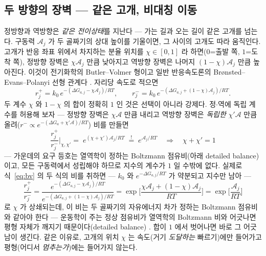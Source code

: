 \documentclass[11pt,a4paper]{article}
\begin{document}
\subsection{두 방향의 장벽 — 같은 고개, 비대칭 이동}
정방향과 역방향은 \emph{같은 전이상태}를 지난다 — 가는 길과 오는 길이 같은 고개를 넘는다. 구동력
$\mathcal A_j$ 가 두 골짜기의 상대 높이를 기울이면, 그 사이의 고개도 따라 움직인다. 고개가 반응 좌표 위에서
차지하는 분율 위치를 $\chi\in[0,1]$ 라 하면($0$=출발 쪽, $1$=도착 쪽), 정방향 장벽은 $\chi\mathcal A_j$
만큼 낮아지고 역방향 장벽은 나머지 $(1-\chi)\mathcal A_j$ 만큼 높아진다. 이것이 전기화학의
Butler--Volmer 형이고 일반 반응속도론의 Br\o nsted--Evans--Polanyi 선형 관계다
\cite{bardfaulkner,evanspolanyi1938}. 자리당 속도로 적으면
\begin{equation}
r_j^+=k_0\,e^{-(\Delta G_{a,j}-\chi\mathcal A_j)/RT},\qquad
r_j^-=k_0\,e^{-(\Delta G_{a,j}+(1-\chi)\mathcal A_j)/RT}.
\label{eq:bv}
\end{equation}
두 계수 $\chi$ 와 $1-\chi$ 의 합이 정확히 $1$ 인 것은 선택이 아니라 강제다. 정$\cdot$역에 독립
계수를 허용해 보자 — 정방향 장벽은 $\chi\mathcal A$ 만큼 내리고 역방향 장벽은 \emph{독립한}
$\chi'\mathcal A$ 만큼 올려($r^-\propto e^{-(\Delta G_a+\chi'\mathcal A)/RT}$) 비를 만들면
\begin{equation}
\frac{r_j^+}{r_j^-}\bigg|_{\chi,\chi'}
=\;e^{(\chi+\chi')\mathcal A_j/RT}
\;\overset{!}{=}\;e^{\mathcal A_j/RT}
\quad\Longrightarrow\quad
\chi+\chi'=1
\label{eq:chisum}
\end{equation}
— 가운데의 요구 등호는 열역학이 정하는 Boltzmann 점유비(아래 detailed balance)이고, 모든 구동력에서
성립해야 하므로 지수의 계수가 $1$ 일 수밖에 없다. 실제로 식~\eqref{eq:bv} 의 두 식의 비를 취하면 —
$k_0$ 와 $e^{-\Delta G_{a,j}/RT}$ 가 약분되고 지수만 남아 —
\begin{equation}
\frac{r_j^+}{r_j^-}
=\frac{e^{-(\Delta G_{a,j}-\chi\mathcal A_j)/RT}}{e^{-(\Delta G_{a,j}+(1-\chi)\mathcal A_j)/RT}}
=\exp\!\Big[\frac{\chi\mathcal A_j+(1-\chi)\mathcal A_j}{RT}\Big]
=\exp\!\Big[\frac{\mathcal A_j}{RT}\Big]
\label{eq:db}
\end{equation}
로 $\chi$ 가 상쇄되는데, 이 비는 두 골짜기의 자유에너지 차가 정하는 Boltzmann 점유비와 같아야 한다 —
운동학이 주는 정상 점유비가 열역학의 Boltzmann 비와 어긋나면 평형 자체가 깨지기 때문이다(detailed
balance) \cite{bazant2013}. 합이 $1$ 에서 벗어나면
바로 그 어긋남이 생긴다. 같은 이유로, 고개의 위치 $\chi$ 는 속도(거기 \emph{도달하는} 빠르기)에만 들어가고
평형(어디서 \emph{멈추는가})에는 들어가지 않는다.
\end{document}

